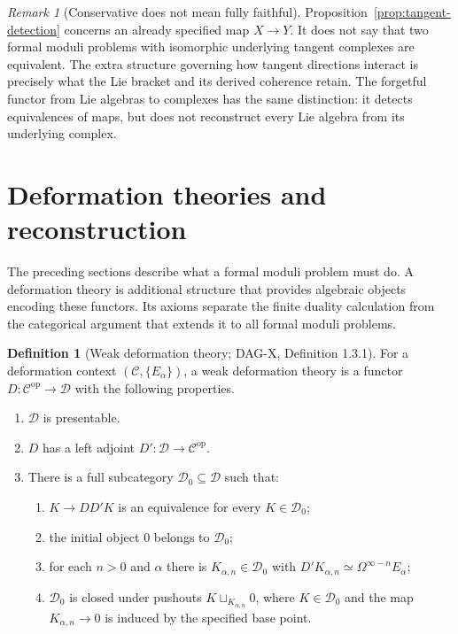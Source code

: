 \documentclass[12pt,letterpaper,oneside]{report}
\theoremstyle{definition}
\newtheorem{definition}[theorem]{Definition}
\theoremstyle{remark}
\newtheorem{remark}[theorem]{Remark}
\newcommand{\cC}{\mathcal C}
\newcommand{\cD}{\mathcal D}
\newcommand{\op}{\mathrm{op}}
\begin{document}
\begin{remark}[Conservative does not mean fully faithful]
Proposition~\ref{prop:tangent-detection} concerns an already specified map $X\to Y$. It does not say that two formal moduli problems with isomorphic underlying tangent complexes are equivalent. The extra structure governing how tangent directions interact is precisely what the Lie bracket and its derived coherence retain. The forgetful functor from Lie algebras to complexes has the same distinction: it detects equivalences of maps, but does not reconstruct every Lie algebra from its underlying complex.
\end{remark}

\section{Deformation theories and reconstruction}
\label{sec:deformation-theory}

The preceding sections describe what a formal moduli problem must do. A deformation theory is additional structure that provides algebraic objects encoding these functors. Its axioms separate the finite duality calculation from the categorical argument that extends it to all formal moduli problems.

\begin{definition}[Weak deformation theory; DAG-X, Definition 1.3.1]
\label{def:weak-theory}
For a deformation context $(\cC,\{E_\alpha\})$, a weak deformation theory is a functor $D:\cC^{\op}\to\cD$ with the following properties.
\begin{enumerate}[label=\textup{(D\arabic*)}]
\item $\cD$ is presentable.
\item $D$ has a left adjoint $D':\cD\to\cC^{\op}$.
\item There is a full subcategory $\cD_0\subseteq\cD$ such that:
\begin{enumerate}[label=\textup{(\alph*)}]
\item $K\to DD'K$ is an equivalence for every $K\in\cD_0$;
\item the initial object $0$ belongs to $\cD_0$;
\item for each $n>0$ and $\alpha$ there is $K_{\alpha,n}\in\cD_0$ with $D'K_{\alpha,n}\simeq\Omega^{\infty-n}E_\alpha$;
\item $\cD_0$ is closed under pushouts $K\mathbin{\sqcup}_{K_{\alpha,n}}0$, where $K\in\cD_0$ and the map $K_{\alpha,n}\to0$ is induced by the specified base point.
\end{enumerate}
\end{enumerate}
\end{definition}
\end{document}
